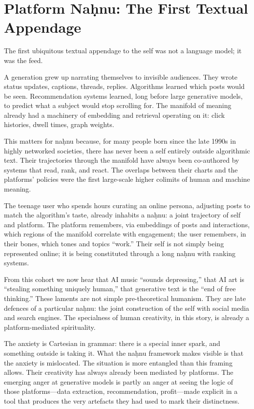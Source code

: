\section{Platform Na\d{h}nu: The First Textual Appendage}

The first ubiquitous textual appendage to the self was not a language model; it was the feed.

A generation grew up narrating themselves to invisible audiences. They wrote status updates, captions, threads, replies. Algorithms learned which posts would be seen. Recommendation systems learned, long before large generative models, to predict what a subject would stop scrolling for. The manifold of meaning already had a machinery of embedding and retrieval operating on it: click histories, dwell times, graph weights.

This matters for na\d{h}nu because, for many people born since the late 1990s in highly networked societies, there has never been a self entirely outside algorithmic text. Their trajectories through the manifold have always been co-authored by systems that read, rank, and react. The overlaps between their charts and the platforms' policies were the first large-scale higher colimits of human and machine meaning.

The teenage user who spends hours curating an online persona, adjusting posts to match the algorithm's taste, already inhabits a na\d{h}nu: a joint trajectory of self and platform. The platform remembers, via embeddings of posts and interactions, which regions of the manifold correlate with engagement; the user remembers, in their bones, which tones and topics ``work.'' Their self is not simply being represented online; it is being constituted through a long na\d{h}nu with ranking systems.

From this cohort we now hear that AI music ``sounds depressing,'' that AI art is ``stealing something uniquely human,'' that generative text is the ``end of free thinking.'' These laments are not simple pre-theoretical humanism. They are late defences of a particular na\d{h}nu: the joint construction of the self with social media and search engines. The specialness of human creativity, in this story, is already a platform-mediated spirituality.

The anxiety is Cartesian in grammar: there is a special inner spark, and something outside is taking it. What the na\d{h}nu framework makes visible is that the anxiety is mislocated. The situation is more entangled than this framing allows. Their creativity has always already been mediated by platforms. The emerging anger at generative models is partly an anger at seeing the logic of those platforms---data extraction, recommendation, profit---made explicit in a tool that produces the very artefacts they had used to mark their distinctness.

